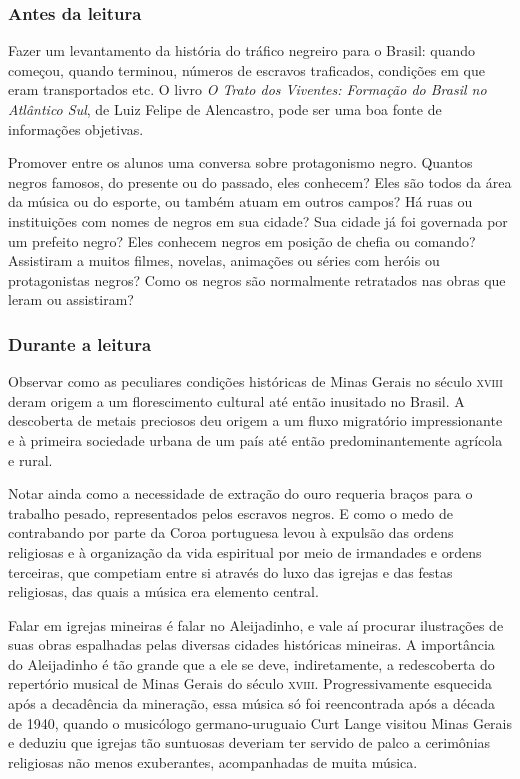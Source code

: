 \documentclass[11pt]{extarticle}
\begin{document}
\subsubsection{Antes da leitura}

Fazer um levantamento da história do tráfico negreiro para o Brasil: quando
começou, quando terminou, números de escravos traficados, condições em que eram
transportados etc. O livro \emph{O Trato dos Viventes: Formação do Brasil no
Atlântico Sul}, de Luiz Felipe de Alencastro, pode ser uma boa fonte de
informações objetivas.

Promover entre os alunos uma conversa sobre protagonismo negro. Quantos negros
famosos, do presente ou do passado, eles conhecem? Eles são todos da área da
música ou do esporte, ou também atuam em outros campos? Há ruas ou instituições
com nomes de negros em sua cidade?  Sua cidade já foi governada por um prefeito
negro? Eles conhecem negros em posição de chefia ou comando? Assistiram a
muitos filmes, novelas, animações ou séries com heróis ou protagonistas negros?
Como os negros são normalmente retratados nas obras que leram ou assistiram?

\subsubsection{Durante a leitura}

  Observar como as peculiares condições históricas de Minas Gerais no século
\textsc{xviii} deram origem a um florescimento cultural até então inusitado no Brasil. A
descoberta de metais preciosos deu origem a um fluxo migratório impressionante
e à primeira sociedade urbana de um país até então predominantemente agrícola e
rural.

Notar ainda como a necessidade de extração do ouro requeria braços para o
trabalho pesado, representados pelos escravos negros. E como o medo de
contrabando por parte da Coroa portuguesa levou à expulsão das ordens
religiosas e à organização da vida espiritual por meio de irmandades e ordens
terceiras, que competiam entre si através do luxo das igrejas e das festas
religiosas, das quais a música era elemento central.

Falar em igrejas mineiras é falar no Aleijadinho, e vale aí procurar
ilustrações de suas obras espalhadas pelas diversas cidades históricas
mineiras. A importância do Aleijadinho é tão grande que a ele se deve,
indiretamente, a redescoberta do repertório musical de Minas Gerais do século
\textsc{xviii}. Progressivamente esquecida após a decadência da mineração, essa música
só foi reencontrada após a década de 1940, quando o musicólogo germano-uruguaio
Curt Lange visitou Minas Gerais e deduziu que igrejas tão suntuosas deveriam
ter servido de palco a cerimônias religiosas não menos exuberantes,
acompanhadas de muita música.
\end{document}
